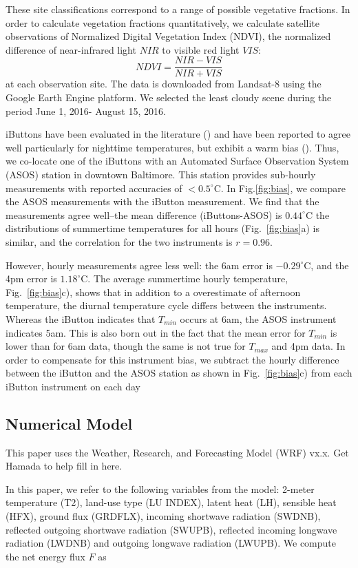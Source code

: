 \documentclass[draft,linenumbers]{agujournal}
\begin{document}
These site classifications correspond to a range of possible vegetative fractions. In order to calculate vegetation fractions quantitatively, we calculate satellite observations of Normalized Digital Vegetation Index (NDVI), the normalized difference of near-infrared light $NIR$ to visible red light $VIS$: 
\[NDVI = \frac{NIR-VIS}{NIR+VIS}\]
at each observation site. The data is downloaded from Landsat-8 using the Google Earth Engine platform. We selected the least cloudy scene during the period June 1, 2016- August 15, 2016. 

iButtons have been evaluated in the literature () and have been reported to agree well particularly for nighttime temperatures, but exhibit a warm bias (). Thus, we co-locate one of the iButtons with an Automated Surface Observation System (ASOS) station in downtown Baltimore. This station provides sub-hourly measurements with reported accuracies of $< 0.5^\circ $C. In Fig.\ref{fig:bias}, we compare the ASOS measurements with the iButton measurement. We find that the measurements agree well--the mean difference (iButtons-ASOS) is $0.44^\circ$C the distributions of summertime temperatures for all hours (Fig.~\ref{fig:bias}a) is similar, and the correlation for the two instruments is $r = 0.96$. 

However, hourly measurements agree less well: the 6am error is $-0.29^\circ$C, and the 4pm error is $1.18^\circ$C. The average summertime hourly temperature, Fig.~\ref{fig:bias}c), shows that in addition to a overestimate of afternoon temperature, the diurnal temperature cycle differs between the instruments. Whereas the iButton indicates that $T_{min}$ occurs at 6am, the ASOS instrument indicates 5am. This is also born out in the fact that the mean error for $T_{min}$ is lower than for 6am data, though the same is not true for $T_{max}$ and 4pm data. In order to compensate for this instrument bias, we subtract the hourly difference between the iButton and the ASOS station as shown in Fig.~\ref{fig:bias}c) from each iButton instrument on each day

\subsection{Numerical Model}
This paper uses the Weather, Research, and Forecasting Model (WRF) vx.x. Get Hamada to help fill in here. 

In this paper, we refer to the following variables from the model: 2-meter temperature (T2),
 land-use type (LU INDEX), latent heat (LH), 
 sensible heat (HFX), ground flux (GRDFLX), 
incoming shortwave radiation (SWDNB),
reflected outgoing shortwave radiation (SWUPB), 
reflected incoming longwave radiation (LWDNB) and outgoing longwave radiation (LWUPB).  We compute the net energy flux $F$ as
\end{document}
